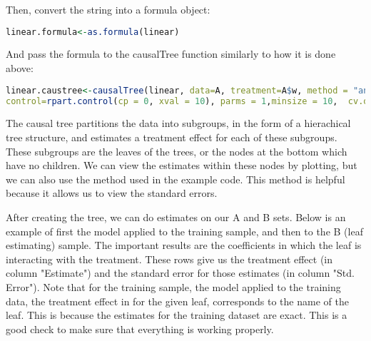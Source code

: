 \documentclass{article}
\begin{document}
Then, convert the string into a formula object:
\begin{lstlisting}[language=R]
linear.formula<-as.formula(linear) 
\end{lstlisting}


And pass the formula to the causalTree function similarly to how it is done above: \\
\begin{lstlisting}[language=R]
linear.caustree<-causalTree(linear, data=A, treatment=A$w, method = "anova", 
control=rpart.control(cp = 0, xval = 10), parms = 1,minsize = 10,  cv.option = "matching", p = 0.5)
\end{lstlisting}


The causal tree partitions the data into subgroups, in the form of a hierachical tree structure, and estimates a treatment effect for each of these subgroups. 
These subgroups are the leaves of the trees, or the nodes at the bottom which have no children. We can view the estimates within these nodes by plotting, but we can also use the method used in the example code. This method is helpful because it allows us to view the standard errors. 

After creating the tree, we can do estimates on our A and B sets. Below is an example of first the model applied to the training sample, and then to the B (leaf estimating) sample. The important results are the coefficients in which  the leaf is interacting with the treatment. These rows give us the treatment effect (in column "Estimate") and the standard error for those estimates (in column "Std. Error"). Note that for the training sample, the model applied to the training data, the treatment effect in for the given leaf, corresponds to the name of the leaf. This is because the estimates for the training dataset are exact. This is a good check to make sure that everything is working properly. 
\end{document}
